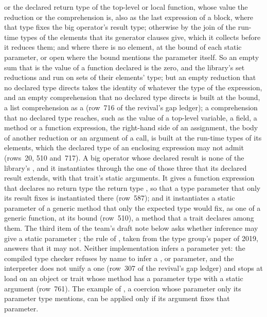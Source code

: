 {or the declared return type of the top-level or local function, whose value the
reduction or the comprehension is, also as the last expression of a block, where
that type fixes the big operator's result type; otherwise by the join of the run-time types of
the elements that its generator clauses give, which it collects before it
reduces them; and where there is no element, at the bound of each static
parameter, or open where the bound mentions the parameter itself.
So an empty sum that is the value of a function declared 
is the  zero, and the library's set reductions
\EXP{\bigcup} and \EXP{\bigcap} run on sets of their elements' type; but an
empty reduction that no declared type directs takes the identity of
 whatever the type of the expression, and an empty
comprehension that no declared type directs is built at the bound, a list
comprehension as a  (row~716 of the
revival's gap ledger); a comprehension that no declared type reaches, such as
the value of a top-level variable, a field, a method or a function expression,
the right-hand side of an assignment, the body of another reduction or an
argument of a call, is
built at the run-time types of its elements, which the declared type of an
enclosing expression may not admit (rows~20, 510 and~717).
A big operator whose declared result is none of the library's
,  and  it instantiates
through the one of those three that its declared result extends, with that
trait's static arguments.
It gives a function expression that declares no return type the return type
, so that a type parameter that only its result fixes is
instantiated there (row~587); and it instantiates a static parameter of a
generic method that only the expected type would fix, as one of a generic
function, at its bound (row~510), a method that a trait declares among them.
The third item of the team's draft note below asks whether inference may give a
static parameter ; the rule of ,
taken from the type group's paper of 2019, answers that it may not.
Neither implementation infers a  parameter yet: the compiled type
checker refuses by name to infer a ,  or 
parameter, and the interpreter does not unify a  one (row~307 of
the revival's gap ledger) and stops at load on an object or trait whose method
has a parameter type with a  static argument (row~761).
The example of , a coercion whose  parameter only
its parameter type mentions, can be applied only if its argument fixes that
parameter.}

